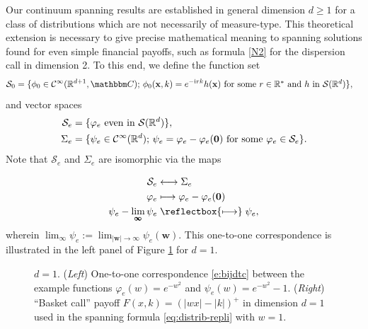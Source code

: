 \documentclass[11pt,A4,twoside]{article}
\numberwithin{equation}{section}
\renewcommand{\b}[1]{{\color{blue}#1}}
\newcommand\longmapsfrom{\mathrel{\reflectbox{\ensuremath{\longmapsto}}}}
\newcommand{\x}{\mathbf{x}}
\newcommand{\w}{\mathbf{w}}
\newcommand{\R}{\mathbbm{R}}
\renewcommand{\S}{\mathcal{S}}
\newcommand{\M}{\Sigma}
\newcommand{\C}{\mathcal{C}}
\newcommand{\beqa}{\begin{eqnarray}}
\newcommand{\eeqa}{\end{eqnarray}}
\def\bal{\begin{aligned}}
\def\eal{\end{aligned}}
\def\bll#1{
\beqa\label{#1}\bal
}\def\lel{\eal\eeqa}
\newcommand{\beql}[1]{\bll{#1}}
\newcommand{\eeql}{\lel}
\theoremstyle{definition}
\theoremstyle{remark}
\def\R{\mathbb{R}}
\def\varphie{\varphi_e}
\def\theh{\b{h}}\def\theh{h}
\def\thermi{{\rm i}}%
\begin{document}
Our continuum spanning results are established in general dimension $d\geq 1$ for a class of distributions which are not necessarily of measure-type.  This theoretical extension is necessary to give precise mathematical meaning to spanning solutions found for even simple financial payoffs, such as formula \eqref{N2} for the dispersion call in dimension 2. To this end, we define the function set   
\begin{align*}
\S_0  &=\{\phi_0 \in \C^\infty(\R^{d+1}, {\mathbbm C}) ;\, \phi_0(\x,  k) = e^{-\thermi   r k} \theh (\x)  \mbox{ for some $r\in\R^* $ and $\theh$ in $\mathcal{S}(\R^d)$}\},
\end{align*}
and vector spaces
\begin{align*} 
 \S_e  &=\{\varphie  \mbox{ even in  } \mathcal{S}(\R^d) \} ,
\\
 \M_e &= \{\psi_e\in\C^\infty(\R^d)  ;\,   \psi_e  = \varphie -\varphie({\bf 0}) \mbox{ for some  }\varphie \in \S_e \} .
\end{align*}
Note that $\S_e$ and $\M_e$ are isomorphic via the maps
\beql{e:bijdtc}
   \S_e &  \longleftrightarrow  \M_e \\
    \varphie & \longmapsto  
     \varphie  -\varphie({\bf 0})  \\
 \psi_e -\lim_{\pmb{\infty}}\psi_e & \longmapsfrom  \psi_e,
\eeql
wherein $\lim_{\pmb{\infty}} \psi_e := \displaystyle \lim_{|\w|\to \infty} \psi_e(\w)$.  This one-to-one correspondence is illustrated in the left panel of Figure \ref{fig:testfunctions} for $d=1$.
\begin{figure}[h]
\begin{subfigure}{.5\linewidth}
    \resizebox{.95\linewidth}{!}{}
\end{subfigure}%
\begin{subfigure}{.5\linewidth}
     \resizebox{.95\linewidth}{!}{}
\end{subfigure}
\caption{$d=1$. (\textit{Left}) One-to-one correspondence \eqref{e:bijdtc} between the example functions $\varphie (w) = e^{-w^2}$ and $\psi_e(w) = e^{-w^2} - 1$. (\textit{Right}) ``Basket call'' payoff $F(x,k) = (|wx|-|k|)^+$ in dimension $d=1$ used in the spanning formula \eqref{eq:distrib-repli} with $w = 1$. }\label{fig:testfunctions}
\end{figure}

 
\end{document}

